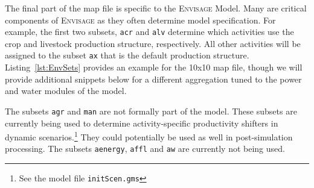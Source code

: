 The final part of the map file is specific to the \textsc{Envisage} Model. Many
are critical components of \textsc{Envisage} as they often determine model
specification. For example, the first two subsets, \texttt{acr} and \texttt{alv}
determine which activities use the crop and livestock production structure,
respectively. All other activities will be assigned to the subset \texttt{ax}
that is the default production structure. Listing~\ref{lst:EnvSets} provides an
example for the 10x10 map file, though we will provide additional snippets below
for a different aggregation tuned to the power and water modules of the model.

The subsets \texttt{agr} and \texttt{man} are not formally part of the model.
These subsets are currently being used to determine activity-specific
productivity shifters in dynamic scenarios.\footnote{See the model file
\texttt{initScen.gms}} They could potentially be used as well in post-simulation
processing. The subsets \texttt{aenergy}, \texttt{affl} and \texttt{aw} are
currently not being used.

